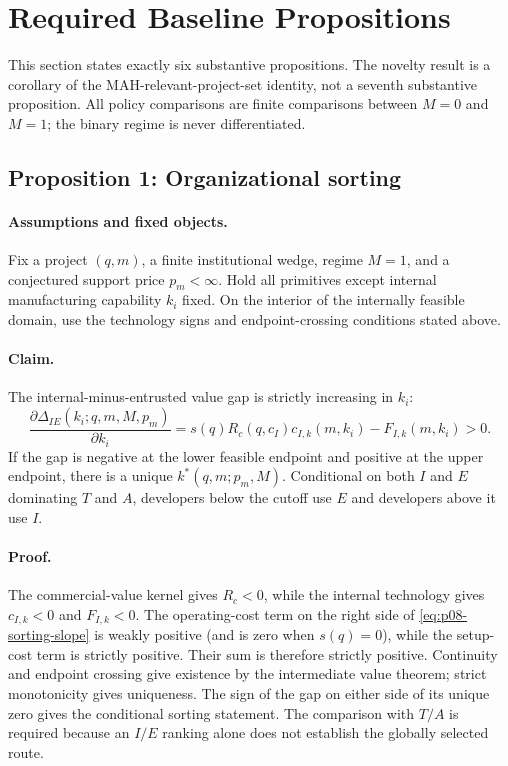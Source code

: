 \section{Required Baseline Propositions}
\label{sec:p08-propositions}

This section states exactly six substantive propositions. The novelty result
is a corollary of the MAH-relevant-project-set identity, not a seventh
substantive proposition. All policy comparisons are finite comparisons between
\(M=0\) and \(M=1\); the binary regime is never differentiated.

\subsection{Proposition 1: Organizational sorting}
\label{prop:p08-sorting}

\paragraph{Assumptions and fixed objects.}
Fix a project \((q,m)\), a finite institutional wedge, regime \(M=1\), and a
conjectured support price \(p_m<\infty\). Hold all primitives except internal
manufacturing capability \(k_i\) fixed. On the interior of the internally feasible domain,
use the technology signs and endpoint-crossing conditions stated above.

\paragraph{Claim.}
The internal-minus-entrusted value gap is strictly increasing in \(k_i\):
\begin{equation}
  \frac{\partial\Delta_{IE}(k_i;q,m,M,p_m)}{\partial k_i}
  =
  s(q)R_c(q,c_I)c_{I,k}(m,k_i)-F_{I,k}(m,k_i)
  >0.
  \label{eq:p08-sorting-slope}
\end{equation}
If the gap is negative at the lower feasible endpoint and positive at the
upper endpoint, there is a unique \(k^*(q,m;p_m,M)\). Conditional on both
\(I\) and \(E\) dominating \(T\) and \(A\), developers below the cutoff use
\(E\) and developers above it use \(I\).

\paragraph{Proof.}
The commercial-value kernel gives \(R_c<0\), while the internal technology
gives \(c_{I,k}<0\) and \(F_{I,k}<0\).
The operating-cost term on the right side of
\eqref{eq:p08-sorting-slope} is weakly positive (and is zero when
\(s(q)=0\)), while the setup-cost term is strictly positive. Their sum is
therefore strictly positive. Continuity and endpoint crossing give existence
by the intermediate value theorem; strict monotonicity gives uniqueness. The sign of
the gap on either side of its unique zero gives the conditional sorting
statement. The comparison with \(T/A\) is required because an \(I/E\) ranking
alone does not establish the globally selected route.

